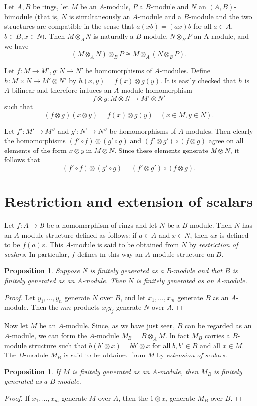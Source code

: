 \documentclass{standalone}
\newtheorem{proposition}[theorem]{Proposition}
\theoremstyle{definition}
\theoremstyle{remark}
\begin{document}
\begin{exercise}\label{exc:2.15}
  Let $A, B$ be rings, let $M$ be an $A$-module, $P$ a $B$-module
and $N$ an $(A, B)$-bimodule (that is, $N$ is simultaneously an $A$-module and
a $B$-module and the two structures are compatible in the sense that
$a(x b)=(a x) b$ for all $a \in A$, $b \in B, x \in N)$. Then $M \otimes_{A} N$
is naturally a $B$-module, $N \otimes_{B} P$ an A-module, and we have
\[
  (M \otimes_{A} N) \otimes_{B} P \cong M \otimes_{A}(N \otimes_{B} P).
\]
\end{exercise}
Let $f\colon M \to M', g\colon N \to N'$ be homomorphisms of $A$-modules. Define
$h\colon M \times N \to M' \otimes N'$ by $h(x, y)=f(x) \otimes g(y)$. It is easily
checked that $h$ is $A$-bilinear and therefore induces an $A$-module
homomorphism
\[
  f \otimes g: M \otimes N \to M' \otimes N'
\]
such that
\[
  (f \otimes g)(x \otimes y)=f(x) \otimes g(y) \quad(x \in M, y \in N) .
\]

Let $f': M' \to M''$ and $g': N' \to N''$ be homomorphisms of $A$-modules. Then
clearly the homomorphisms
$(f' \circ f) \otimes(g' \circ g)$ and
$(f' \otimes g') \circ(f \otimes g)$ agree on all elements of the
form $x \otimes y$ in $M \otimes N$. Since these elements generate
$M \otimes N$, it follows that
\[
  (f' \circ f) \otimes(g' \circ g)=(f' \otimes g') \circ(f \otimes g) .
\]
\section{Restriction and extension of scalars}
Let $f\colon A \to B$ be a homomorphism of rings and let $N$ be a $B$-module. Then
$N$ has an $A$-module structure defined as follows: if $a \in A$ and $x \in N$,
then $a x$ is defined to be $f(a) x$. This $A$-module is said to be obtained
from $N$ by {\itshape restriction of scalars}. In particular, $f$ defines in this way an
$A$-module structure on $B$.
\begin{proposition}
  \label{prop:2.16}
  Suppose $N$ is finitely generated
as a $B$-module and that $B$ is finitely generated as an
$A$-module. Then $N$ is finitely generated as an 
$A$-module. 
\end{proposition}
\begin{proof}
  Let $y_{1}, \ldots, y_{n}$ generate $N$ over $B$, and let
$x_{1}, \ldots, x_{m}$ generate $B$ as an $A$-module. Then the $m n$ products
$x_{i} y_{j}$ generate $N$ over $A$.
\end{proof}
Now let $M$ be an $A$-module. Since, as we have just seen, $B$ can be regarded
as an $A$-module, we can form the $A$-module $M_{B}=B \otimes_{A} M$. In fact
$M_{B}$ carries a $B$-module structure such that
$b(b' \otimes x)=b b' \otimes x$ for all $b, b' \in B$ and all
$x \in M$. The $B$-module $M_{B}$ is said to be obtained from $M$ by
{\itshape extension of scalars}.
\begin{proposition}
  \label{prop:2.17}
  If $M$ is finitely generated as an $A$-module, then $M_{B}$ is
finitely generated as a $B$-module.
\end{proposition}
\begin{proof}
  If $x_{1}, \ldots, x_{m}$ generate $M$ over $A$, then the
$1 \otimes x_{i}$ generate $M_{B}$ over $B$.
\end{proof}
\end{document}
